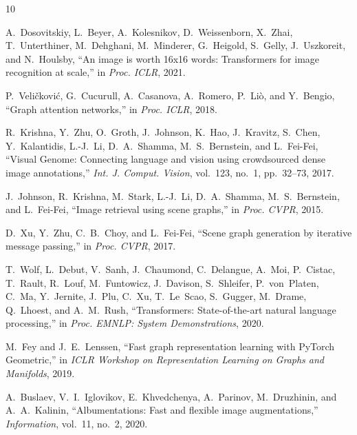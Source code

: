 \documentclass[conference]{IEEEtran}
\begin{document}

\begin{thebibliography}{10}

A.~Dosovitskiy, L.~Beyer, A.~Kolesnikov, D.~Weissenborn, X.~Zhai, T.~Unterthiner, M.~Dehghani, M.~Minderer, G.~Heigold, S.~Gelly, J.~Uszkoreit, and N.~Houlsby,
``An image is worth 16x16 words: Transformers for image recognition at scale,''
in \emph{Proc. ICLR}, 2021.

P.~Veli\v{c}kovi\'{c}, G.~Cucurull, A.~Casanova, A.~Romero, P.~Li\`{o}, and Y.~Bengio,
``Graph attention networks,''
in \emph{Proc. ICLR}, 2018.

R.~Krishna, Y.~Zhu, O.~Groth, J.~Johnson, K.~Hao, J.~Kravitz, S.~Chen, Y.~Kalantidis, L.-J.~Li, D.~A.~Shamma, M.~S.~Bernstein, and L.~Fei-Fei,
``Visual Genome: Connecting language and vision using crowdsourced dense image annotations,''
\emph{Int. J. Comput. Vision}, vol.~123, no.~1, pp.~32--73, 2017.

J.~Johnson, R.~Krishna, M.~Stark, L.-J.~Li, D.~A.~Shamma, M.~S.~Bernstein, and L.~Fei-Fei,
``Image retrieval using scene graphs,''
in \emph{Proc. CVPR}, 2015.

D.~Xu, Y.~Zhu, C.~B.~Choy, and L.~Fei-Fei,
``Scene graph generation by iterative message passing,''
in \emph{Proc. CVPR}, 2017.

T.~Wolf, L.~Debut, V.~Sanh, J.~Chaumond, C.~Delangue, A.~Moi, P.~Cistac, T.~Rault, R.~Louf, M.~Funtowicz, J.~Davison, S.~Shleifer, P.~von~Platen, C.~Ma, Y.~Jernite, J.~Plu, C.~Xu, T.~Le~Scao, S.~Gugger, M.~Drame, Q.~Lhoest, and A.~M.~Rush,
``Transformers: State-of-the-art natural language processing,''
in \emph{Proc. EMNLP: System Demonstrations}, 2020.

M.~Fey and J.~E.~Lenssen,
``Fast graph representation learning with PyTorch Geometric,''
in \emph{ICLR Workshop on Representation Learning on Graphs and Manifolds}, 2019.

A.~Buslaev, V.~I.~Iglovikov, E.~Khvedchenya, A.~Parinov, M.~Druzhinin, and A.~A.~Kalinin,
``Albumentations: Fast and flexible image augmentations,''
\emph{Information}, vol.~11, no.~2, 2020.

\end{thebibliography}
\end{document}
